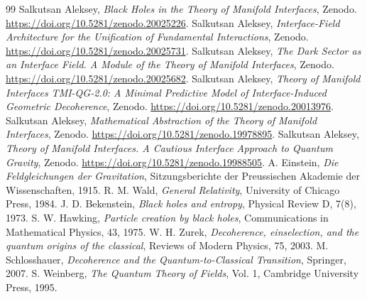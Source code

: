\documentclass[12pt,a4paper]{article}
\begin{document}
\begin{thebibliography}{99}
 Salkutsan Aleksey, \textit{Black Holes in the Theory of Manifold Interfaces}, Zenodo. \href{https://doi.org/10.5281/zenodo.20025226}{https://doi.org/10.5281/zenodo.20025226}.
 Salkutsan Aleksey, \textit{Interface-Field Architecture for the Unification of Fundamental Interactions}, Zenodo. \href{https://doi.org/10.5281/zenodo.20025731}{https://doi.org/10.5281/zenodo.20025731}.
 Salkutsan Aleksey, \textit{The Dark Sector as an Interface Field. A Module of the Theory of Manifold Interfaces}, Zenodo. \href{https://doi.org/10.5281/zenodo.20025682}{https://doi.org/10.5281/zenodo.20025682}.
 Salkutsan Aleksey, \textit{Theory of Manifold Interfaces TMI-QG-2.0: A Minimal Predictive Model of Interface-Induced Geometric Decoherence}, Zenodo. \href{https://doi.org/10.5281/zenodo.20013976}{https://doi.org/10.5281/zenodo.20013976}.
 Salkutsan Aleksey, \textit{Mathematical Abstraction of the Theory of Manifold Interfaces}, Zenodo. \href{https://doi.org/10.5281/zenodo.19978895}{https://doi.org/10.5281/zenodo.19978895}.
 Salkutsan Aleksey, \textit{Theory of Manifold Interfaces. A Cautious Interface Approach to Quantum Gravity}, Zenodo. \href{https://doi.org/10.5281/zenodo.19988505}{https://doi.org/10.5281/zenodo.19988505}.
 A. Einstein, \textit{Die Feldgleichungen der Gravitation}, Sitzungsberichte der Preussischen Akademie der Wissenschaften, 1915.
 R. M. Wald, \textit{General Relativity}, University of Chicago Press, 1984.
 J. D. Bekenstein, \textit{Black holes and entropy}, Physical Review D, 7(8), 1973.
 S. W. Hawking, \textit{Particle creation by black holes}, Communications in Mathematical Physics, 43, 1975.
 W. H. Zurek, \textit{Decoherence, einselection, and the quantum origins of the classical}, Reviews of Modern Physics, 75, 2003.
 M. Schlosshauer, \textit{Decoherence and the Quantum-to-Classical Transition}, Springer, 2007.
 S. Weinberg, \textit{The Quantum Theory of Fields}, Vol. 1, Cambridge University Press, 1995.
\end{thebibliography}
\end{document}
